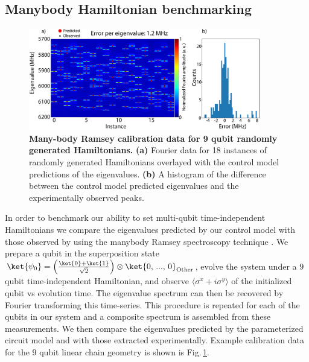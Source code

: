 \subsection{Manybody Hamiltonian benchmarking}
\begin{figure}
    \centering
    \includegraphics[width=0.9\textwidth, keepaspectratio]{./PDF/random_hamiltonian_calibration_data_190508_549p.pdf}
    \caption{\textbf{Many-body Ramsey calibration data for 9 qubit randomly generated Hamiltonians.}
    \textbf{(a)} Fourier data for 18 instances of randomly generated Hamiltonians overlayed with the control model predictions of the eigenvalues.
    \textbf{(b)} A histogram of the difference between the control model predicted eigenvalues and the experimentally observed peaks.
    \label{manybody_hamiltonian_benchmarking}
    }\end{figure}
    In order to benchmark our ability to set multi-qubit time-independent Hamiltonians we compare the eigenvalues predicted by our control model with those observed by using the manybody Ramsey spectroscopy technique \autocite{Roushan2018}.
    We prepare a qubit in the superposition state
    $\ket{\psi_0} = \left( \frac{\ket{0} + \ket{1} }{\sqrt{2}} \right) \otimes \ket{ \text{0, ..., 0} }_{\text{Other}}$,
    evolve the system under a $9$ qubit time-independent Hamiltonian, and observe $\langle \sigma^x + i \sigma^y \rangle$ of the initialized qubit vs evolution time.
    The eigenvalue spectrum can then be recovered by Fourier transforming this time-series.
    This procedure is repeated for each of the qubits in our system and a composite spectrum is assembled from these measurements.
We then compare the eigenvalues predicted by the parameterized circuit model and with those extracted experimentally.  Example calibration data for the 9 qubit linear chain geometry is shown is Fig.\,\ref{manybody_hamiltonian_benchmarking}.

